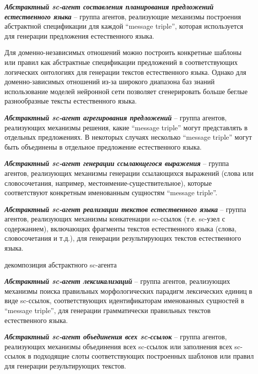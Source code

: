 \textit{\textbf{Абстрактный sc-агент составления планирования предложений естественного языка}} -- группа агентов, реализующие механизмы построения абстрактной спецификации для каждой ``message triple'', которая используется для генерации предложения естественного языка.

Для доменно-независимых отношений можно построить конкретные шаблоны или правил как абстрактные спецификации предложений в соответствующих логических онтологиях для генерации текстов естественного языка. Однако для доменно-зависимых отношений из-за широкого диапазона баз знаний использование моделей нейронной сети позволяет сгенерировать больше беглые разнообразные тексты естественного языка. 

\textit{\textbf{Абстрактный sc-агент агрегирования предложений}} -- группа агентов, реализующих механизмы решения, какие ``message triple'' могут представлять в отдельных предложениях. В некоторых случаях несколько ``message triple'' могут быть объединены в отдельное предложение естественного языка.

\textit{\textbf{Абстрактный sc-агент генерации ссылающегося выражения}} -- группа агентов, реализующих механизмы генерации ссылающихся выражений (слова или словосочетания, например, местоимение-существительное), которые соответствуют конкретным именованным сущностям ``message triple''.

\textit{\textbf{Абстрактный sc-агент реализации текстов естественного языка}} -- группа агентов, реализующих механизмы конкатенации sc-ссылок (т.е. sc-узел с содержанием), включающих фрагменты текстов естественного языка (слова, словосочетания и т.д.), для генерации результирующих текстов естественного языка. 
\begin{SCn}
	\begin{scnrelfromset}{декомпозиция абстрактного sc-агента}
	\end{scnrelfromset}
\end{SCn}

\textit{\textbf{Абстрактный sc-агент лексикализаций}} -- группа агентов, реализующих механизмы поиска правильных морфологических парадигм лексических единиц в виде sc-ссылок, соответствующих идентификаторам именованных сущностей в ``message triple'', для генерации грамматически правильных текстов естественного языка.

\textit{\textbf{Абстрактный sc-агент объединения всех sc-ссылок}} -- группа агентов, реализующих механизмы объединения всех sc-ссылок или заполнения всех sc-ссылок в подходящие слоты соответствующих построенных шаблонов или правил для генерации результирующих текстов. 

